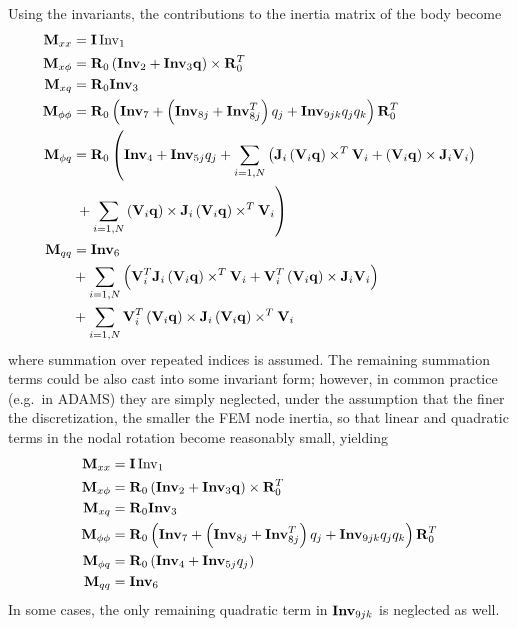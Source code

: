 Using the invariants, the contributions to the inertia matrix of the body
become
\begin{subequations}
\begin{align}
	\bm{\mathbf{M}}_{xx}	&= \bm{\mathbf{I}} \, \mathrm{Inv}_1 \\
	\bm{\mathbf{M}}_{x\phi}	&= \bm{\mathbf{R}}_0 \left( 
		\bm{\mathbf{Inv}}_2 + \bm{\mathbf{Inv}}_3 \bm{\mathbf{q}} \right)\times{}  \bm{\mathbf{R}}_0^T \\
	\bm{\mathbf{M}}_{xq}	&= \bm{\mathbf{R}}_0 \bm{\mathbf{Inv}}_3 \\
	\bm{\mathbf{M}}_{\phi\phi}&= \bm{\mathbf{R}}_0 \left( 
		\bm{\mathbf{Inv}}_7
		+ \left( \bm{\mathbf{Inv}}_{8j} + \bm{\mathbf{Inv}}_{8j}^T \right) q_j
		+ \bm{\mathbf{Inv}}_{9jk} q_j q_k
	 \right) \bm{\mathbf{R}}_0^T \\
	\bm{\mathbf{M}}_{\phi q}	&= \bm{\mathbf{R}}_0 \left( 
		\bm{\mathbf{Inv}}_4
		+ \bm{\mathbf{Inv}}_{5j} q_j 
		+ \sum_{i=1,N} \left( 
			\bm{\mathbf{J}}_i \left( \bm{\mathbf{V}}_i \bm{\mathbf{q}} \right)\times^T \bm{\mathbf{V}}_i
			+ \left( \bm{\mathbf{V}}_i \bm{\mathbf{q}} \right)\times \bm{\mathbf{J}}_i \bm{\mathbf{V}}_i
		 \right)
	 \right. \nonumber \\
			& \left.  \mbox{} + \sum_{i=1,N} \left( \bm{\mathbf{V}}_i \bm{\mathbf{q}} \right)\times \bm{\mathbf{J}}_i \left( \bm{\mathbf{V}}_i \bm{\mathbf{q}} \right)\times^T \bm{\mathbf{V}}_i
	 \right) \\
	\bm{\mathbf{M}}_{qq}	&= \bm{\mathbf{Inv}}_6 \nonumber \\
			& \mbox{} + \sum_{i=1,N} \left( 
			\bm{\mathbf{V}}_i^T \bm{\mathbf{J}}_i \left( \bm{\mathbf{V}}_i \bm{\mathbf{q}} \right)\times^T \bm{\mathbf{V}}_i
			+ \bm{\mathbf{V}}_i^T \left( \bm{\mathbf{V}}_i \bm{\mathbf{q}} \right)\times \bm{\mathbf{J}}_i \bm{\mathbf{V}}_i
	 \right) \nonumber \\
			& \mbox{} + \sum_{i=1,N}
			\bm{\mathbf{V}}_i^T \left( \bm{\mathbf{V}}_i \bm{\mathbf{q}} \right)\times \bm{\mathbf{J}}_i \left( \bm{\mathbf{V}}_i \bm{\mathbf{q}} \right)\times^T \bm{\mathbf{V}}_i
\end{align}
\end{subequations}
where summation over repeated indices is assumed.
The remaining summation terms could be also cast into some invariant form;
however, in common practice (e.g.\ in ADAMS) they are simply neglected,
under the assumption that the finer the discretization, the smaller 
the FEM node inertia, so that linear and quadratic terms 
in the nodal rotation become reasonably small, yielding
\begin{subequations}
\begin{align}
	\bm{\mathbf{M}}_{xx}	&= \bm{\mathbf{I}} \, \mathrm{Inv}_1 \\
	\bm{\mathbf{M}}_{x\phi}	&= \bm{\mathbf{R}}_0 \left( 
		\bm{\mathbf{Inv}}_2 + \bm{\mathbf{Inv}}_3 \bm{\mathbf{q}} \right)\times{}  \bm{\mathbf{R}}_0^T \\
	\bm{\mathbf{M}}_{xq}	&= \bm{\mathbf{R}}_0 \bm{\mathbf{Inv}}_3 \\
	\bm{\mathbf{M}}_{\phi\phi}&= \bm{\mathbf{R}}_0 \left( 
		\bm{\mathbf{Inv}}_7
		+ \left( \bm{\mathbf{Inv}}_{8j} + \bm{\mathbf{Inv}}_{8j}^T \right) q_j
		+ \bm{\mathbf{Inv}}_{9jk} q_j q_k
	 \right) \bm{\mathbf{R}}_0^T \\
	\bm{\mathbf{M}}_{\phi q}	&= \bm{\mathbf{R}}_0 \left( 
		\bm{\mathbf{Inv}}_4
		+ \bm{\mathbf{Inv}}_{5j} q_j 
	 \right) \\
	\bm{\mathbf{M}}_{qq}	&= \bm{\mathbf{Inv}}_6 
\end{align}
\end{subequations}
In some cases, the only remaining quadratic term in $\bm{\mathbf{Inv}}_{9jk}$
is neglected as well.



